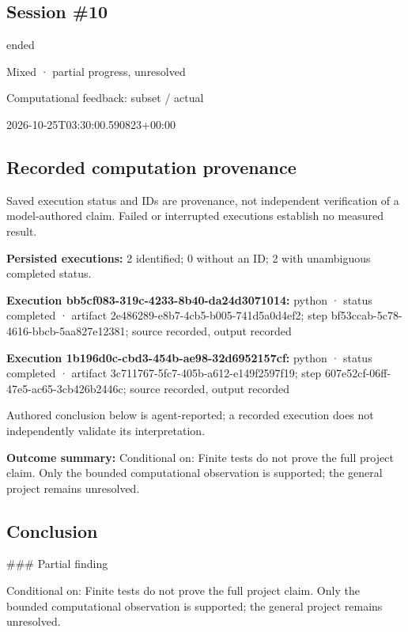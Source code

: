 \documentclass[11pt]{article}
\begin{document}
\subsection{Session \#10}
\begin{description}[style=nextline,font=\normalfont\bfseries,leftmargin=0pt,labelsep=0pt]
\item[Execution status] ended
\item[Outcome] Mixed · partial progress, unresolved
\item[Strategy] Computational feedback: subset / actual
\item[Started] 2026-10-25T03:30:00.590823+00:00
\end{description}
\subsection{Recorded computation provenance}
Saved execution status and IDs are provenance, not independent verification of a model-authored claim. Failed or interrupted executions establish no measured result.\par
\textbf{Persisted executions:} 2 identified; 0 without an ID; 2 with unambiguous completed status.\par
\textbf{Execution bb5cf083-319c-4233-8b40-da24d3071014:} python · status completed · artifact 2e486289-e8b7-4cb5-b005-741d5a0d4ef2; step bf53ccab-5c78-4616-bbcb-5aa827e12381; source recorded, output recorded\par
\textbf{Execution 1b196d0c-cbd3-454b-ae98-32d6952157cf:} python · status completed · artifact 3c711767-5fc7-405b-a612-e149f2597f19; step 607e52cf-06ff-47e5-ac65-3cb426b2446c; source recorded, output recorded\par
Authored conclusion below is agent-reported; a recorded execution does not independently validate its interpretation.\par
\textbf{Outcome summary:} Conditional on: Finite tests do not prove the full project claim. Only the bounded computational observation is supported; the general project remains unresolved.\par
\subsection{Conclusion}
\#\#\# Partial finding

Conditional on: Finite tests do not prove the full project claim. Only the bounded computational observation is supported; the general project remains unresolved.
\end{document}
